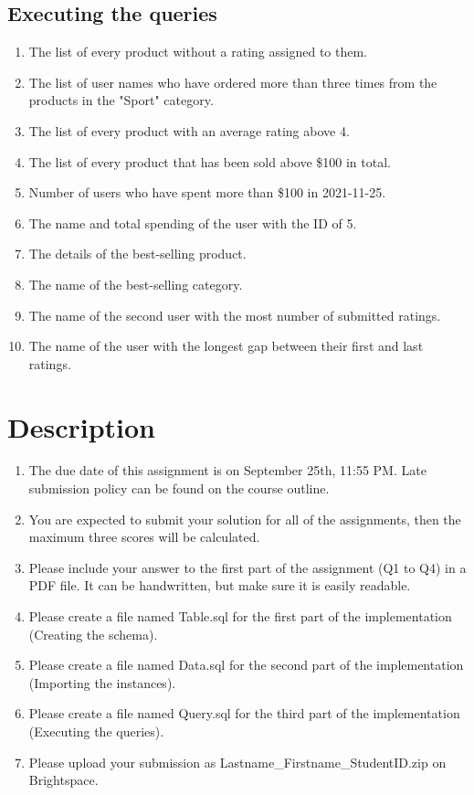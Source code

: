 \documentclass{homework}
\begin{document}
\subsection*{Executing the queries}
\begin{enumerate}
    \item The list of every product without a rating assigned to them.
    \item The list of user names who have ordered more than three times from the products in the "Sport" category.
    \item The list of every product with an average rating above 4.
    \item The list of every product that has been sold above \$100 in total.
    \item Number of users who have spent more than \$100 in 2021-11-25.
    \item The name and total spending of the user with the ID of 5.
    \item The details of the best-selling product.
    \item The name of the best-selling category.
    \item The name of the second user with the most number of submitted ratings.
    \item The name of the user with the longest gap between their first and last ratings.
\end{enumerate}

\section*{Description}
\begin{enumerate}
    \item The due date of this assignment is on September 25th, 11:55 PM. Late submission policy can be found on the course outline.
    \item You are expected to submit your solution for all of the assignments, then the maximum three scores will be calculated.
    \item Please include your answer to the first part of the assignment (Q1 to Q4) in a PDF file. It can be handwritten, but make sure it is easily readable.
    \item Please create a file named Table.sql for the first part of the implementation (Creating the schema).
    \item Please create a file named Data.sql for the second part of the implementation (Importing the instances).
    \item Please create a file named Query.sql for the third part of the implementation (Executing the queries).
    \item Please upload your submission as Lastname\_Firstname\_StudentID.zip on Brightspace.
\end{enumerate}
\end{document}
